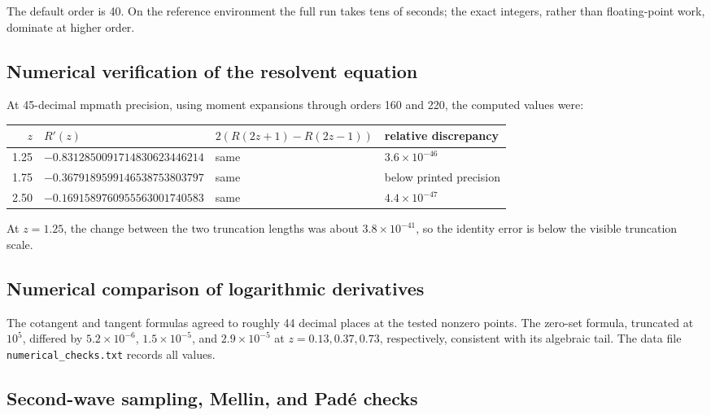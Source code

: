 \documentclass[11pt,oneside]{article}
\theoremstyle{definition}
\begin{document}
The default order is 40.  On the reference environment the full run takes tens of seconds;
the exact integers, rather than floating-point work, dominate at higher order.

\subsection{Numerical verification of the resolvent equation}

At 45-decimal mpmath precision, using moment expansions through orders 160 and 220, the
computed values were:
\begin{center}
\footnotesize
\begin{tabular}{rlll}
\toprule
\(z\) & \(R'(z)\) & \(2(R(2z+1)-R(2z-1))\) & relative discrepancy \\
\midrule
1.25 & \(-0.8312850091714830623446214\) & same & \(3.6\times10^{-46}\) \\
1.75 & \(-0.3679189599146538753803797\) & same & below printed precision \\
2.50 & \(-0.1691589760955563001740583\) & same & \(4.4\times10^{-47}\) \\
\bottomrule
\end{tabular}
\end{center}
At \(z=1.25\), the change between the two truncation lengths was about
\(3.8\times10^{-41}\), so the identity error is below the visible truncation scale.

\subsection{Numerical comparison of logarithmic derivatives}

The cotangent and tangent formulas agreed to roughly 44 decimal places at the tested
nonzero points.  The zero-set formula, truncated at \(10^5\), differed by
\(5.2\times10^{-6}\), \(1.5\times10^{-5}\), and \(2.9\times10^{-5}\) at
\(z=0.13,0.37,0.73\), respectively, consistent with its algebraic tail.  The data file
\texttt{numerical\_checks.txt} records all values.



\subsection{Second-wave sampling, Mellin, and Pad\'e checks}
\end{document}
